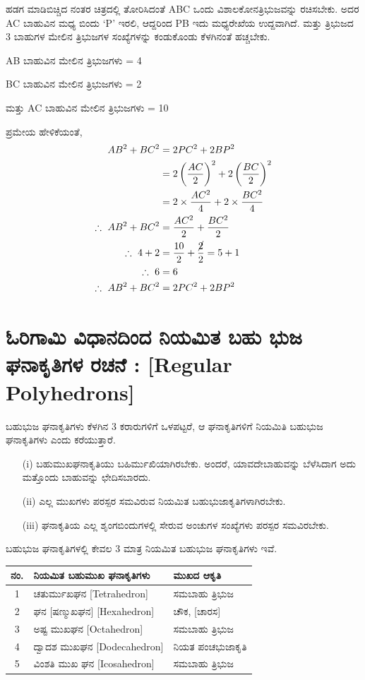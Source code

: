 ಹಡಗ ಮಾಡಿಬಿಚ್ಚಿದ ನಂತರ ಚಿತ್ರದಲ್ಲಿ ತೋರಿಸಿದಂತೆ ABC ಒಂದು ವಿಶಾಲಕೋನ\break  ತ್ರಿಭುಜವನ್ನು ರಚಿಸಬೇಕು. ಅದರ AC ಬಾಹುವಿನ ಮಧ್ಯ ಬಿಂದು  `P' ಇರಲಿ, ಆದ್ದರಿಂದ  PB ಇದು ಮಧ್ಯರೇಖೆಯ ಉದ್ದವಾಗಿದೆ. ಮತ್ತು ತ್ರಿಭುಜದ 3 ಬಾಹುಗಳ ಮೇಲಿನ ತ್ರಿಭುಜಗಳ ಸಂಖ್ಯೆಗಳನ್ನು ಕಂಡುಕೊಂಡು ಕೆಳಗಿನಂತೆ ಹಚ್ಚಬೇಕು. 

AB ಬಾಹುವಿನ ಮೇಲಿನ ತ್ರಿಭುಜಗಳು = 4

BC ಬಾಹುವಿನ ಮೇಲಿನ ತ್ರಿಭುಜಗಳು = 2

ಮತ್ತು AC ಬಾಹುವಿನ ಮೇಲಿನ ತ್ರಿಭುಜಗಳು = 10

ಪ್ರಮೇಯ ಹೇಳಿಕೆಯಂತೆ, 
\begin{align*}
AB^2 + BC^2 & = 2 PC^2 + 2 B P^2\\
& = 2 \left(\frac{AC}{2} \right)^2 + 2 \left(\frac{BC}{2} \right)^2\\
& = 2 \times \frac{AC^2}{4} + 2 \times \frac{BC^2}{4}\\
\therefore ~ AB^2 + BC^2 & = \frac{AC^2}{2} + \frac{BC^2}{2}\\
\therefore ~ 4+ 2 & = \frac{10}{2} + \frac{\cancel{2}}{2} = 5+1\\
\therefore ~ 6 & = 6 \\
\therefore ~ AB^2 + BC^2 & = 2 PC^2 + 2 BP^2 
\end{align*}

\section{ಓರಿಗಾಮಿ ವಿಧಾನದಿಂದ  ನಿಯಮಿತ ಬಹು ಭುಜ ಘನಾಕೃತಿಗಳ ರಚನೆ : [Regular Polyhedrons]}\label{sec1.11}%

ಬಹುಭುಜ ಘನಾಕೃತಿಗಳು ಕೆಳಗಿನ 3 ಕರಾರುಗಳಿಗೆ ಒಳಪಟ್ಟರೆ, ಆ ಘನಾಕೃತಿಗಳಿಗೆ ನಿಯಮಿತಿ ಬಹುಭುಜ ಘನಾಕೃತಿಗಳು ಎಂದು ಕರೆಯುತ್ತಾರೆ.

\smallskip

\begin{itemize}
\item[(i)] ಬಹುಮುಖಘನಾಕೃತಿಯು ಬಹಿರ್ಮುಖಿಯಾಗಿರಬೇಕು. ಅಂದರೆ, ಯಾವದೇ\break ಬಾಹುವನ್ನು ಬೆಳೆಸಿದಾಗ ಅದು ಮತ್ತೊಂದು ಬಾಹುವನ್ನು ಛೇದಿಸಬಾರದು.

\item[(ii)] ಎಲ್ಲ ಮುಖಗಳು ಪರಸ್ಪರ ಸಮವಿರುವ ನಿಯಮಿತ ಬಹುಭುಜಾಕೃತಿಗಳಾಗಿರಬೇಕು.

\item[(iii)] ಘನಾಕೃತಿಯ ಎಲ್ಲ ಶೃಂಗಬಿಂದುಗಳಲ್ಲಿ ಸೇರುವ ಅಂಚುಗಳ ಸಂಖ್ಯೆಗಳು ಪರಸ್ಪರ ಸಮವಿರಬೇಕು. 
\end{itemize}

ಬಹುಭುಜ ಘನಾಕೃತಿಗಳಲ್ಲಿ ಕೇವಲ 3 ಮಾತ್ರ ನಿಯಮಿತ ಬಹುಭುಜ ಘನಾಕೃತಿಗಳು ಇವೆ. 

\begin{tabular}{|c|l|l|}
\hline
ನಂ. & ನಿಯಮಿತ ಬಹುಮುಖ ಘನಾಕೃತಿಗಳು & ಮುಖದ ಆಕೃತಿ \\
\hline
1 & ಚತುರ್ಮುಖಘನ [Tetrahedron] &  ಸಮಬಾಹು ತ್ರಿಭುಜ\\
\hline
2 &ಘನ [ಷಣ್ಮುಖಘನ] [Hexahedron] &  ಚೌಕ, [ಚಾರಸ]\\
\hline
3 & ಅಷ್ಟ ಮುಖಘನ [Octahedron] & ಸಮಬಾಹು ತ್ರಿಭುಜ\\
\hline
4 & ದ್ವಾದಶ ಮುಖಘನ [Dodecahedron] & ನಿಯತ ಪಂಚಭುಜಾಕೃತಿ\\
\hline
5 & ವಿಂಶತಿ ಮುಖ ಘನ [Icosahedron] &  ಸಮಬಾಹು ತ್ರಿಭುಜ \\
\hline
\end{tabular}

